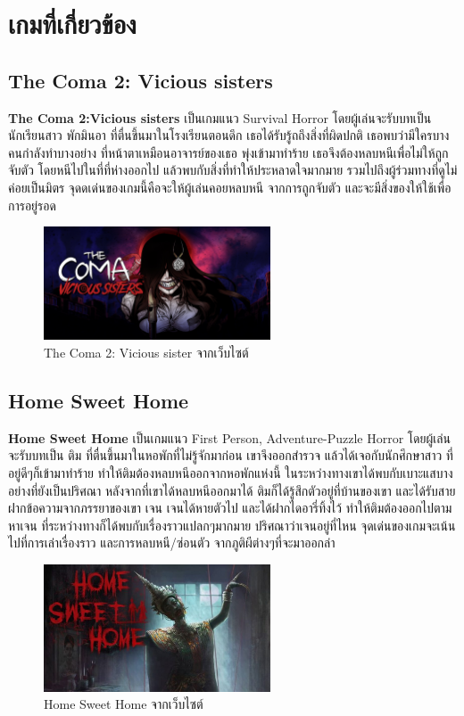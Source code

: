 \section{เกมที่เกี่ยวข้อง}
\subsection{The Coma 2: Vicious sisters}
\subsubitem \textbf{The Coma 2:Vicious sisters} \cite{the-coma-2:theory} เป็นเกมแนว Survival Horror โดยผู้เล่นจะรับบทเป็นนักเรียนสาว พักมินอา ที่ตื่นขึ้นมาในโรงเรียนตอนดึก เธอได้รับรู้ถถึงสิ่งที่ผิดปกติ เธอพบว่ามีใครบางคนกำลังทำบางอย่าง ที่หน้าตาเหมือนอาจารย์ของเธอ พุ่งเข้ามาทำร้าย เธอจึงต้องหลบหนีเพื่อไม่ให้ถูกจับตัว โดยหนีไปในที่ที่ห่างออกไป แล้วพบกับสิ่งที่ทำให้ประหลาดใจมากมาย รวมไปถึงผู้ร่วมทางที่ดูไม่ค่อยเป็นมิตร จุดดเด่นของเกมนี้คือจะให้ผู้เล่นคอยหลบหนี จากการถูกจับตัว และจะมีสิ่งของให้ใช้เพื่อการอยู่รอด
\begin{figure}[h]
  \centering
  \includegraphics[width=0.6\textwidth, height=0.2\textheight]{Images/H2x1_NSwitchDS_TheComa2ViciousSisters.jpg}
  \caption{The Coma 2: Vicious sister จากเว็บไซต์}\label{TheComa2ViciousSisters}
\end{figure}

\subsection{Home Sweet Home}
\subsubitem \textbf{Home Sweet Home} \cite{home-sweet-home:theory} เป็นเกมแนว First Person, Adventure-Puzzle Horror โดยผู้เล่นจะรับบทเป็น ติม ที่ตื่นขึ้นมาในหอพักที่ไม่รู้จักมาก่อน เขาจึงออกสำรวจ แล้วได้เจอกับนักศึกษาสาว ที่อยู่ดีๆก็เข้ามาทำร้าย ทำให้ติมต้องหลบหนีออกจากหอพักแห่งนี้ ในระหว่างทางเขาได้พบกับเบาะแสบางอย่างที่ยังเป็นปริศณา หลังจากที่เขาได้หลบหนีออกมาได้ ติมก็ได้รู้สึกตัวอยู่ที่บ้านของเขา และได้รับสายฝากข้อความจากภรรยาของเขา เจน เจนได้หายตัวไป และได้ฝากไดอารี่ทิ้งไว้ ทำให้ติมต้องออกไปตามหาเจน ที่ระหว่างทางก็ได้พบกับเรื่องราวแปลกๆมากมาย ปริศณาว่าเจนอยู่ที่ไหน จุดเด่นของเกมจะเน้นไปที่การเล่าเรื่องราว และการหลบหนี/ซ่อนตัว จากภูติผีต่างๆที่จะมาออกล่า
\begin{figure}[h]
  \centering
  \includegraphics[width=0.6\textwidth, height=0.2\textheight]{Images/800px-HomeSweetHomePoster1.jpg}
  \caption{Home Sweet Home จากเว็บไซต์}\label{HomeSweetHomePoster1}
\end{figure}

